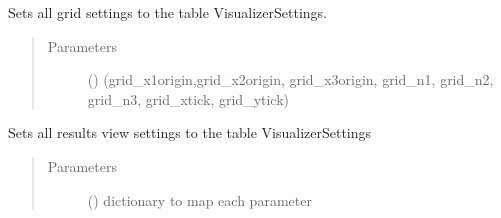 \documentclass[letterpaper,10pt,english]{sphinxmanual}
\begin{document}
\begin{fulllineitems}
\begin{fulllineitems}
\begin{quote}
\begin{description}
\end{description}\end{quote}

\end{fulllineitems}


\begin{fulllineitems}
\label{\detokenize{api:beamon.database.database.Database.set_grid_settings}}
Sets all grid settings to the table VisualizerSettings.
\begin{quote}\begin{description}
\item[{Parameters}] \leavevmode
{} () \textendash{} (grid\_x1origin,grid\_x2origin, grid\_x3origin, grid\_n1, grid\_n2, grid\_n3, grid\_xtick, grid\_ytick)

\end{description}\end{quote}

\end{fulllineitems}


\begin{fulllineitems}
\label{\detokenize{api:beamon.database.database.Database.set_results_view_settings}}
Sets all results view settings to the table VisualizerSettings
\begin{quote}\begin{description}
\item[{Parameters}] \leavevmode
{} () \textendash{} dictionary to map each parameter

\end{description}\end{quote}


\end{fulllineitems}
\end{fulllineitems}
\end{document}
